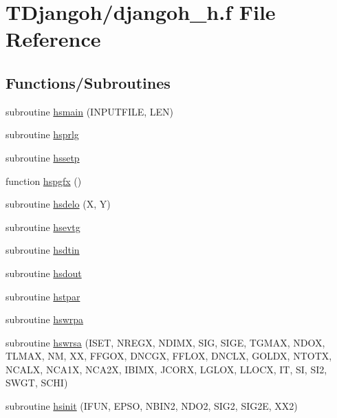 \hypertarget{djangoh__h_8f}{\section{T\+Djangoh/djangoh\+\_\+h.f File Reference}
\label{djangoh__h_8f}
}
\subsection*{Functions/\+Subroutines}
\begin{DoxyCompactItemize}
\item 
subroutine \hyperlink{djangoh__h_8f_a5cbb776920602741af10008871753e20}{hsmain} (I\+N\+P\+U\+T\+F\+I\+L\+E, L\+E\+N)
\item 
subroutine \hyperlink{djangoh__h_8f_ae64899b0086d84846f527740cfcea200}{hsprlg}
\item 
subroutine \hyperlink{djangoh__h_8f_a478ee949c7cec470871f14198ba84b60}{hssetp}
\item 
function \hyperlink{djangoh__h_8f_ae4f7d7eafc157933f20c44984bdac615}{hspgfx} ()
\item 
subroutine \hyperlink{djangoh__h_8f_a13f8e2a9bca26ea6b144d7f7c2c77683}{hsdelo} (X, Y)
\item 
subroutine \hyperlink{djangoh__h_8f_a6f85840f87285710e2f6ce6566e79581}{hsevtg}
\item 
subroutine \hyperlink{djangoh__h_8f_a75408b439858c48c653d5b2cbaf2f099}{hsdtin}
\item 
subroutine \hyperlink{djangoh__h_8f_a6faac2947913d13362a869376a417962}{hsdout}
\item 
subroutine \hyperlink{djangoh__h_8f_a0b0d674a4b4aea309c251c4a07d61bb1}{hstpar}
\item 
subroutine \hyperlink{djangoh__h_8f_a2aa234e8b8498626a453541dbf82ffcd}{hswrpa}
\item 
subroutine \hyperlink{djangoh__h_8f_ac80c50c923abd35fd307b7ee21c09406}{hswrsa} (I\+S\+E\+T, N\+R\+E\+G\+X, N\+D\+I\+M\+X, S\+I\+G, S\+I\+G\+E, T\+G\+M\+A\+X, N\+D\+O\+X, T\+L\+M\+A\+X, N\+M, X\+X, F\+F\+G\+O\+X, D\+N\+C\+G\+X, F\+F\+L\+O\+X, D\+N\+C\+L\+X, G\+O\+L\+D\+X, N\+T\+O\+T\+X, N\+C\+A\+L\+X, N\+C\+A1\+X, N\+C\+A2\+X, I\+B\+I\+M\+X, J\+C\+O\+R\+X, L\+G\+L\+O\+X, L\+L\+O\+C\+X, I\+T, S\+I, S\+I2, S\+W\+G\+T, S\+C\+H\+I)
\item 
subroutine \hyperlink{djangoh__h_8f_afa43b203c023b0f6b66302ebcdb277f9}{hsinit} (I\+F\+U\+N, E\+P\+S\+O, N\+B\+I\+N2, N\+D\+O2, S\+I\+G2, S\+I\+G2\+E, X\+X2)
\item 

\end{DoxyCompactItemize}
